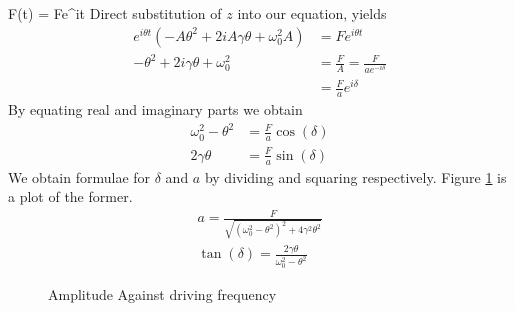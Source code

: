 \begin{bigtest}{F(t) = Fe^{i\theta t}}
    Direct substitution of $z$ into our equation, yields 
    \begin{align*}
        e^{i\theta t}(-A\theta^2 + 2iA\gamma\theta + \omega_0^2A) &= Fe^{i\theta t} \\
        -\theta^2 + 2i\gamma\theta + \omega_0^2 &= \frac{F}{A} = \frac{F}{a e^{-i\delta}} \\
         &= \frac{F}{a} e^{i\delta}
    \end{align*}
    By equating real and imaginary parts we obtain
    \begin{align*}
        \omega_0^2 - \theta^2 &= \frac{F}{a}\cos(\delta) \\
        2\gamma\theta &= \frac{F}{a}\sin(\delta)
    \end{align*}
    We obtain formulae for $\delta$ and $a$ by dividing and squaring respectively. 
    Figure \ref{fig:drivingAmplitude} is a plot of the former.
    \begin{gather*} 
        a = \frac{F}{\sqrt{(\omega_0^2 - \theta^2)^2 +  4\gamma^2\theta^2}} \\
        \tan(\delta) = \frac{2\gamma\theta }{\omega_0^2 - \theta^2}
    \end{gather*}
    \begin{figure}[ht]
        \centering
        \caption{Amplitude Against driving frequency}
        \label{fig:drivingAmplitude}
    \end{figure}
\end{bigtest}

